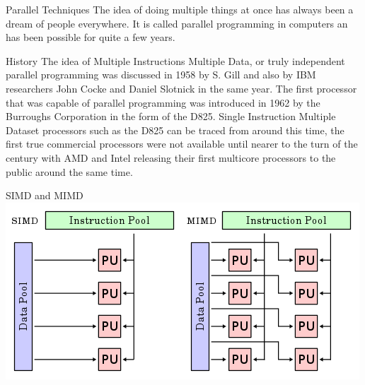 \documentclass[final]{beamer}
\begin{document}
\begin{frame}{}
\begin{columns}[t]
      
      \begin{column}{.32\linewidth}
        \begin{block}{Parallel Techniques}
          The idea of doing multiple things at once has always been a dream of people everywhere. It is called parallel programming in computers an has been possible for quite a few years.
        \end{block}
        
        \begin{block}{History}
          The idea of Multiple Instructions Multiple Data, or truly independent parallel programming was discussed in 1958 by S. Gill and also by IBM researchers John Cocke and Daniel Slotnick in the same year. The first processor that was capable of parallel programming was introduced in 1962 by the Burroughs Corporation in the form of the D825. Single Instruction Multiple Dataset processors such as the D825 can be traced from around this time, the first true commercial processors were not available until nearer to the turn of the century with AMD and Intel releasing their first multicore processors to the public around the same time.
        \end{block}
        
        \begin{block}{SIMD and MIMD}
          \includegraphics[width=\columnwidth]{parallel.png} 
        \end{block}
        

\end{column}
\end{columns}
\end{frame}
\end{document}
